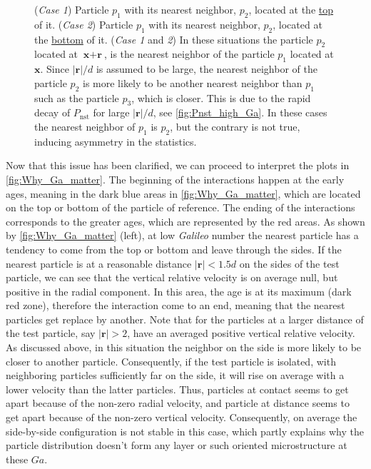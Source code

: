 \begin{figure}[h!]
{        (\textit{Case 1}) Particle $p_1$ with  its nearest neighbor, $p_2$, located at the \underline{top} of it. 
        (\textit{Case 2}) Particle $p_1$ with  its nearest neighbor, $p_2$, located at the \underline{bottom} of it. 
        (\textit{Case 1} and \textit{2})
        In these situations the particle $p_2$ located at $\textbf{x} + \textbf{r}$, is the nearest neighbor of the particle $p_1$ located at $\textbf{x}$. 
        Since $|\textbf{r}|/d$ is assumed to be large, the nearest neighbor of the particle $p_2$ is more likely to be another nearest neighbor than $p_1$ such as the particle $p_3$, which is closer.
        This is due to the rapid decay of $P_\text{nst}$ for large $|\textbf{r}|/d$, see \ref{fig:Pnst_high_Ga}. 
        In these cases the nearest neighbor of $p_1$ is $p_2$, but the contrary is not true, inducing asymmetry in the statistics.  
    }
    \label{fig:diagram_asym}
\end{figure}

Now that this issue has been clarified, we can proceed to interpret the plots in \ref{fig:Why_Ga_matter}.
The beginning of the interactions happen at the early ages, meaning in the dark blue areas in  \ref{fig:Why_Ga_matter}, which are located on the top or bottom of the particle of reference.
The ending of the interactions corresponds to the greater ages, which are represented by the red areas. 
As shown by \ref{fig:Why_Ga_matter} (left), at low \textit{Galileo} number the nearest particle has a tendency to come from the top or bottom and leave through the sides. 
If the nearest particle is at a reasonable distance $|\textbf{r}| < 1.5d$ on the sides of the test particle, we can see that the vertical relative velocity is on average null, but positive in the radial component.
In this area, the age is at its maximum (dark red zone), therefore the interaction come to an end, meaning that the nearest particles get replace by another. 
Note that for the particles at a larger distance of the test particle, say $|\textbf{r}|>2$, have an averaged positive vertical relative velocity. 
As discussed above, in this situation the neighbor on the side is more likely to be closer to another particle. 
Consequently, if the test particle is isolated, with neighboring particles sufficiently far on the side, it will rise on average with a lower velocity than the latter particles.
Thus, particles at contact  seems to get apart because of the non-zero radial velocity, and particle at distance seems to get apart because of the non-zero vertical velocity.  
Consequently, on average the side-by-side configuration is not stable in this case, which partly explains why the particle distribution doesn't form any layer or such oriented microstructure at these $Ga$.   

